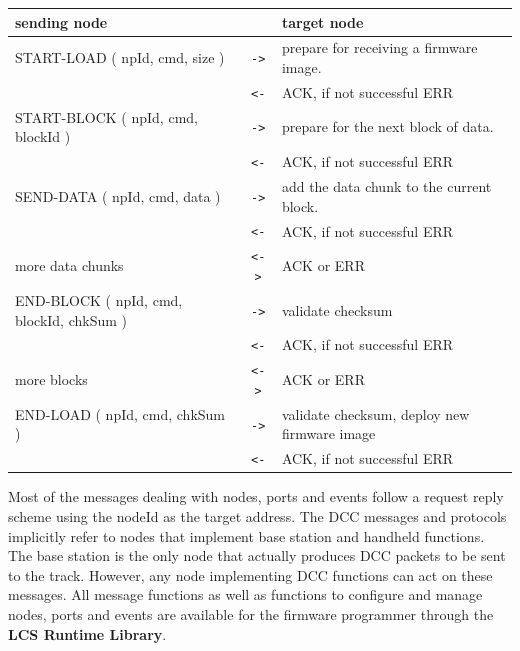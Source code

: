 \begin{table}[ht!]
    \begin{center}
        \begin{tabular}{|p{}| c |p{}|}
            \toprule
            \textbf{sending node} & & \textbf{ target node} \\
            \midrule
            START-LOAD ( npId, cmd, size ) & \texttt{->} & prepare for receiving a firmware image. \\
            & \texttt{<-} & ACK, if not successful ERR \\
            \midrule
            START-BLOCK ( npId, cmd, blockId ) & \texttt{->} & prepare for the next block of data. \\
            & \texttt{<-} & ACK, if not successful ERR \\
            \midrule
            SEND-DATA ( npId, cmd, data ) & \texttt{->} & add the data chunk to the current block. \\
            & \texttt{<-} & ACK, if not successful ERR \\
            \midrule
            more data chunks & \texttt{<->} & ACK or ERR \\
            \midrule
            END-BLOCK ( npId, cmd, blockId, chkSum ) & \texttt{->} & validate checksum \\
            & \texttt{<-} & ACK, if not successful ERR \\
            \midrule
            more blocks & \texttt{<->} & ACK or ERR \\
            \midrule
            END-LOAD ( npId, cmd, chkSum ) & \texttt{->} & validate checksum, deploy new firmware image \\
            & \texttt{<-} & ACK, if not successful ERR \\
            \bottomrule
        \end{tabular}
    \end{center}
\end{table}


Most of the messages dealing with nodes, ports and events follow a request reply scheme using the nodeId as the target address. The DCC messages and protocols implicitly refer to nodes that implement base station and handheld functions. The base station is the only node that actually produces DCC packets to be sent to the track. However, any node implementing DCC functions can act on these messages. All message functions as well as functions to configure and manage nodes, ports and events are available for the firmware programmer through the \textbf{LCS Runtime Library}. 


